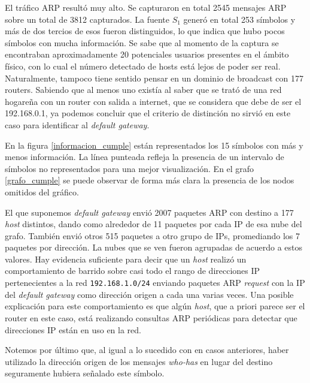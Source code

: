 El tráfico ARP resultó muy alto. Se capturaron en total 2545 mensajes ARP sobre un total de 3812 capturados. La fuente $S_1$ generó en total 253 símbolos y más de dos tercios de esos fueron distinguidos, lo que indica que hubo pocos símbolos con mucha información. Se sabe que al momento de la captura se encontraban aproximadamente 20 potenciales usuarios presentes en el ámbito físico, con lo cual el número detectado de hosts está lejos de poder ser real. Naturalmente, tampoco tiene sentido pensar en un dominio de broadcast con 177 routers. Sabiendo que al menos uno existía al saber que se trató de una red hogareña con un router con salida a internet, que se considera que debe de ser el 192.168.0.1, ya podemos concluir que el criterio de distinción no sirvió en este caso para identificar al \textit{default gateway}.

En la figura \ref{informacion_cumple} están representados los 15 símbolos con más y menos información. La línea punteada refleja la presencia de un intervalo de símbolos no representados para una mejor visualización. En el grafo \ref{grafo_cumple} se puede observar de forma más clara la presencia de los nodos omitidos del gráfico.

El que suponemos \textit{default gateway} envió 2007 paquetes ARP con destino a 177 \textit{host} distintos, dando como alrededor de 11 paquetes por cada IP de esa nube del grafo. También envió otros 515 paquetes a otro grupo de IPs, promediando los 7 paquetes por dirección. La nubes que se ven fueron agrupadas de acuerdo a estos valores. Hay evidencia suficiente para decir que un \textit{host} realizó un comportamiento de barrido sobre casi todo el rango de direcciones IP pertenecientes a la red \texttt{192.168.1.0/24} enviando paquetes ARP \textit{request} con la IP del \textit{default gateway} como dirección origen a cada una varias veces. Una posible explicación para este comportamiento es que algún \textit{host}, que a priori parece ser el router en este caso, está realizando consultas ARP periódicas para detectar que direcciones IP están en uso en la red.

Notemos por último que, al igual a lo sucedido con en casos anteriores, haber utilizado la dirección origen de los mensajes \textit{who-has} en lugar del destino seguramente hubiera señalado este símbolo.



